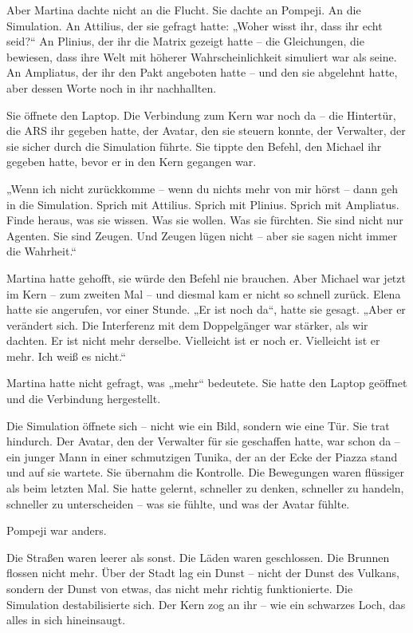 \documentclass[
]{article}
\begin{document}
Aber Martina dachte nicht an die Flucht. Sie dachte an Pompeji. An die Simulation. An Attilius, der sie gefragt hatte: „Woher wisst ihr, dass ihr echt seid?{\kern0pt}`` An Plinius, der ihr die Matrix gezeigt hatte -- die Gleichungen, die bewiesen, dass ihre Welt mit höherer Wahrscheinlichkeit simuliert war als seine. An Ampliatus, der ihr den Pakt angeboten hatte -- und den sie abgelehnt hatte, aber dessen Worte noch in ihr nachhallten.

Sie öffnete den Laptop. Die Verbindung zum Kern war noch da -- die Hintertür, die ARS ihr gegeben hatte, der Avatar, den sie steuern konnte, der Verwalter, der sie sicher durch die Simulation führte. Sie tippte den Befehl, den Michael ihr gegeben hatte, bevor er in den Kern gegangen war.

„Wenn ich nicht zurückkomme -- wenn du nichts mehr von mir hörst -- dann geh in die Simulation. Sprich mit Attilius. Sprich mit Plinius. Sprich mit Ampliatus. Finde heraus, was sie wissen. Was sie wollen. Was sie fürchten. Sie sind nicht nur Agenten. Sie sind Zeugen. Und Zeugen lügen nicht -- aber sie sagen nicht immer die Wahrheit.``

Martina hatte gehofft, sie würde den Befehl nie brauchen. Aber Michael war jetzt im Kern -- zum zweiten Mal -- und diesmal kam er nicht so schnell zurück. Elena hatte sie angerufen, vor einer Stunde. „Er ist noch da``, hatte sie gesagt. „Aber er verändert sich. Die Interferenz mit dem Doppelgänger war stärker, als wir dachten. Er ist nicht mehr derselbe. Vielleicht ist er noch er. Vielleicht ist er mehr. Ich weiß es nicht.``

Martina hatte nicht gefragt, was „mehr`` bedeutete. Sie hatte den Laptop geöffnet und die Verbindung hergestellt.

Die Simulation öffnete sich -- nicht wie ein Bild, sondern wie eine Tür. Sie trat hindurch. Der Avatar, den der Verwalter für sie geschaffen hatte, war schon da -- ein junger Mann in einer schmutzigen Tunika, der an der Ecke der Piazza stand und auf sie wartete. Sie übernahm die Kontrolle. Die Bewegungen waren flüssiger als beim letzten Mal. Sie hatte gelernt, schneller zu denken, schneller zu handeln, schneller zu unterscheiden -- was sie fühlte, und was der Avatar fühlte.

Pompeji war anders.

Die Straßen waren leerer als sonst. Die Läden waren geschlossen. Die Brunnen flossen nicht mehr. Über der Stadt lag ein Dunst -- nicht der Dunst des Vulkans, sondern der Dunst von etwas, das nicht mehr richtig funktionierte. Die Simulation destabilisierte sich. Der Kern zog an ihr -- wie ein schwarzes Loch, das alles in sich hineinsaugt.
\end{document}
